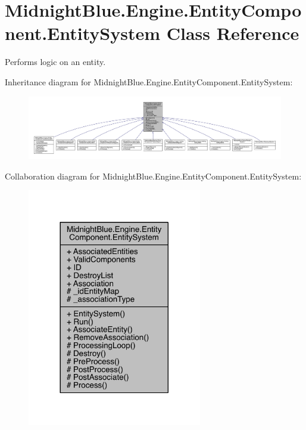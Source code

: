 \hypertarget{class_midnight_blue_1_1_engine_1_1_entity_component_1_1_entity_system}{}\section{Midnight\+Blue.\+Engine.\+Entity\+Component.\+Entity\+System Class Reference}
\label{class_midnight_blue_1_1_engine_1_1_entity_component_1_1_entity_system}


Performs logic on an entity.  




Inheritance diagram for Midnight\+Blue.\+Engine.\+Entity\+Component.\+Entity\+System\+:
\nopagebreak
\begin{figure}[H]
\begin{center}
\leavevmode
\includegraphics[width=350pt]{class_midnight_blue_1_1_engine_1_1_entity_component_1_1_entity_system__inherit__graph}
\end{center}
\end{figure}


Collaboration diagram for Midnight\+Blue.\+Engine.\+Entity\+Component.\+Entity\+System\+:
\nopagebreak
\begin{figure}[H]
\begin{center}
\leavevmode
\includegraphics[width=216pt]{class_midnight_blue_1_1_engine_1_1_entity_component_1_1_entity_system__coll__graph}
\end{center}
\end{figure}
